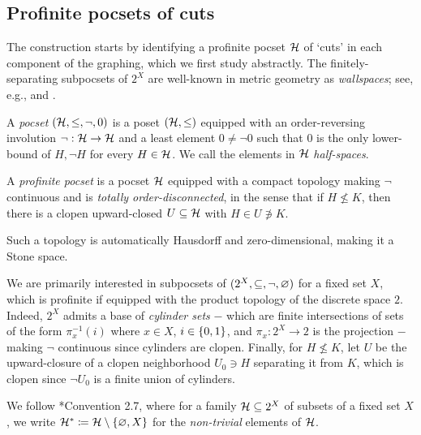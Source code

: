 \documentclass[reqno]{amsart}
\begin{document}
    \subsection{Profinite pocsets of cuts}\label{sec:pocsets_of_cuts}

    The construction starts by identifying a profinite pocset $\mc{H}$ of `cuts' in each component of the graphing, which we first study abstractly. The finitely-separating subpocsets of $2^X$ are well-known in metric geometry as \textit{wallspaces}; see, e.g., \cite{Nic04} and \cite{CN05}.

    \begin{definition}\label{def:profinite_pocset}
        A \textit{pocset} $(\mc{H},\leq,\lnot,0)$ is a poset $(\mc{H},\leq)$ equipped with an order-reversing involution $\lnot:\mc{H}\to\mc{H}$ and a least element $0\neq\lnot0$ such that $0$ is the only lower-bound of $H,\lnot H$ for every $H\in\mc{H}$. We call the elements in $\mc{H}$ \textit{half-spaces}.

        A \textit{profinite pocset} is a pocset $\mc{H}$ equipped with a compact topology making $\lnot$ continuous and is \textit{totally order-disconnected}, in the sense that if $H\not\leq K$, then there is a clopen upward-closed $U\subseteq\mc{H}$ with $H\in U\not\ni K$.
    \end{definition}

    \begin{remark}
        Such a topology is automatically Hausdorff and zero-dimensional, making it a Stone space.
    \end{remark}

    We are primarily interested in subpocsets of $(2^X,\subseteq,\lnot,\em)$ for a fixed set $X$, which is profinite if equipped with the product topology of the discrete space $2$. Indeed, $2^X$ admits a base of \textit{cylinder sets} $-$ which are finite intersections of sets of the form $\pi^{-1}_x(i)$ where $x\in X$, $i\in\l\{0,1\r\}$, and $\pi_x:2^X\to2$ is the projection $-$ making $\lnot$ continuous since cylinders are clopen. Finally, for $H\not\leq K$,  let $U$ be the upward-closure of a clopen neighborhood $U_0\ni H$ separating it from $K$, which is clopen since $\lnot U_0$ is a finite union of cylinders.

    \begin{remark*}
        We follow \cite{CPTT23}*{Convention 2.7}, where for a family $\mc{H}\subseteq2^X$ of subsets of a fixed set $X$, we write $\mc{H}^\ast\coloneqq\mc{H}\comp\l\{\em,X\r\}$ for the \textit{non-trivial} elements of $\mc{H}$.
    \end{remark*}
\end{document}
